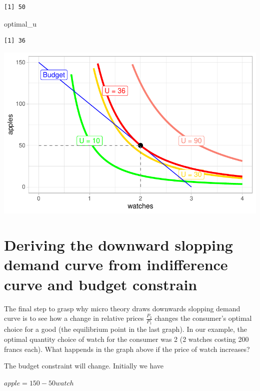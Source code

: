 \documentclass[
  letterpaper,
  DIV=11,
  numbers=noendperiod]{scrreprt}
\newenvironment{Shaded}{\begin{snugshade}}{\end{snugshade}}
\newcommand{\NormalTok}[1]{\textcolor[rgb]{0.00,0.23,0.31}{#1}}
\begin{document}
\begin{verbatim}
[1] 50
\end{verbatim}

\begin{Shaded}
\begin{Highlighting}[]
\NormalTok{optimal\_u}
\end{Highlighting}
\end{Shaded}

\begin{verbatim}
[1] 36
\end{verbatim}

\includegraphics{consumer-theory_files/figure-pdf/unnamed-chunk-14-1.pdf}

\hypertarget{deriving-the-downward-slopping-demand-curve-from-indifference-curve-and-budget-constrain}{%
\section{Deriving the downward slopping demand curve from indifference
curve and budget
constrain}\label{deriving-the-downward-slopping-demand-curve-from-indifference-curve-and-budget-constrain}}

The final step to grasp why micro theory draws downwards slopping demand
curve is to see how a change in relative prices \(\frac{P_2}{P_1}\)
changes the consumer's optimal choice for a good (the equilibrium point
in the last graph). In our example, the optimal quantity choice of watch
for the consumer was 2 (2 watches costing 200 francs each). What
happends in the graph above if the price of watch increases?

The budget constraint will change. Initially we have

\(apple = 150 - 50watch\)
\end{document}
